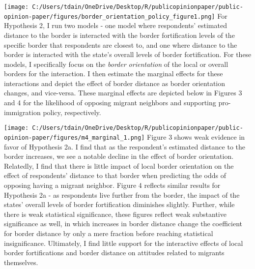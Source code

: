 \documentclass[12pt,]{article}
\begin{document}
\texttt{[image: C:/Users/tdain/OneDrive/Desktop/R/publicopinionpaper/public-opinion-paper/figures/border\_orientation\_policy\_figure1.png]}
For Hypothesis 2, I run two models - one model where respondents'
estimated distance to the border is interacted with the border
fortification levels of the specific border that respondents are closest
to, and one where distance to the border is interacted with the state's
overall levels of border fortification. For these models, I specifically
focus on the \emph{border orientation} of the local or overall borders
for the interaction. I then estimate the marginal effects for these
interactions and depict the effect of border distance as border
orientation changes, and vice-versa. These marginal effects are depicted
below in Figures 3 and 4 for the likelihood of opposing migrant
neighbors and supporting pro-immigration policy, respectively.

\texttt{[image: C:/Users/tdain/OneDrive/Desktop/R/publicopinionpaper/public-opinion-paper/figures/m4\_marginal\_1.png]}
Figure 3 shows weak evidence in favor of Hypothesis 2a. I find that as
the respondent's estimated distance to the border increases, we see a
notable decline in the effect of border orientation. Relatedly, I find
that there is little impact of local border orientation on the effect of
respondents' distance to that border when predicting the odds of
opposing having a migrant neighbor. Figure 4 reflects similar results
for Hypothesis 2a - as respondents live further from the border, the
impact of the states' overall levels of border fortification diminishes
slightly. Further, while there is weak statistical significance, these
figures reflect weak substantive significance as well, in which
increases in border distance change the coefficient for border distance
by only a mere fraction before reaching statistical insignificance.
Ultimately, I find little support for the interactive effects of local
border fortifications and border distance on attitudes related to
migrants themselves.
\end{document}

